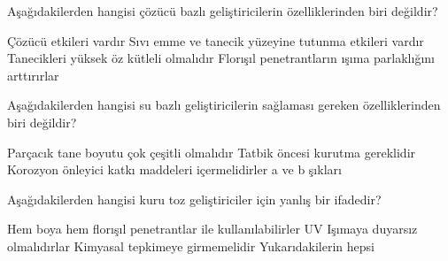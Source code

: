 \begin{question}[subtitle=]
Aşağıdakilerden hangisi çözücü bazlı geliştiricilerin özelliklerinden biri değildir?
	\begin{tasks}
          \task Çözücü etkileri vardır
          \task Sıvı emme ve tanecik yüzeyine tutunma etkileri vardır
          \task Tanecikleri yüksek öz kütleli olmalıdır \correct
          \task Florışıl penetrantların ışıma parlaklığını arttırırlar
	\end{tasks}
\end{question}
\begin{solution}
	\correct
\end{solution}

\begin{question}[subtitle=]
Aşağıdakilerden hangisi su bazlı geliştiricilerin sağlaması gereken özelliklerinden biri değildir?
	\begin{tasks}
          \task Parçacık tane boyutu çok çeşitli olmalıdır
          \task Tatbik öncesi kurutma gereklidir
          \task Korozyon önleyici katkı maddeleri içermelidirler
          \task a ve b şıkları \correct
	\end{tasks}
\end{question}
\begin{solution}
	\correct
\end{solution}

\begin{question}[subtitle=]
Aşağıdakilerden hangisi kuru toz geliştiriciler için yanlış bir ifadedir?
	\begin{tasks}
          \task Hem boya hem florışıl penetrantlar ile kullanılabilirler \correct
          \task UV Işımaya duyarsız olmalıdırlar
          \task Kimyasal tepkimeye girmemelidir
          \task Yukarıdakilerin hepsi
	\end{tasks}
\end{question}
\begin{solution}
	\correct
\end{solution}
